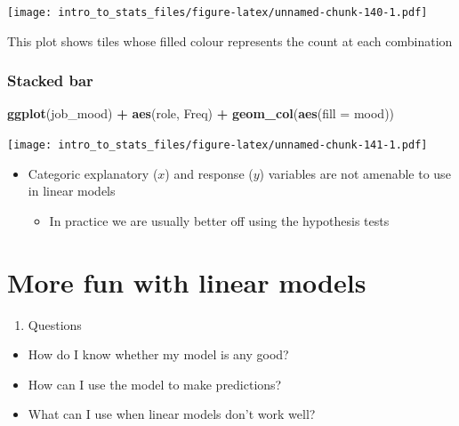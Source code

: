 \documentclass[
]{book}
\newenvironment{Shaded}{\begin{snugshade}}{\end{snugshade}}
\newcommand{\DataTypeTok}[1]{\textcolor[rgb]{0.13,0.29,0.53}{#1}}
\newcommand{\KeywordTok}[1]{\textcolor[rgb]{0.13,0.29,0.53}{\textbf{#1}}}
\newcommand{\NormalTok}[1]{#1}
\newcommand{\OperatorTok}[1]{\textcolor[rgb]{0.81,0.36,0.00}{\textbf{#1}}}
\newcommand{\StringTok}[1]{\textcolor[rgb]{0.31,0.60,0.02}{#1}}
\providecommand{\tightlist}{%
  \setlength{\itemsep}{0pt}\setlength{\parskip}{0pt}}
\newenvironment{roundup}
{ \begin{tcolorbox}[colbacktitle=yellow!50!white,
title=Round Up,coltitle=black,
fonttitle=\bfseries] }
{  \end{tcolorbox} }
\begin{document}
\texttt{[image: intro\_to\_stats\_files/figure-latex/unnamed-chunk-140-1.pdf]}

This plot shows tiles whose filled colour represents the count at each combination

\hypertarget{stacked-bar}{%
\subsection{Stacked bar}\label{stacked-bar}}

\begin{Shaded}
\begin{Highlighting}[]
\KeywordTok{ggplot}\NormalTok{(job_mood) }\OperatorTok{+}\StringTok{ }\KeywordTok{aes}\NormalTok{(role, Freq) }\OperatorTok{+}\StringTok{ }\KeywordTok{geom_col}\NormalTok{(}\KeywordTok{aes}\NormalTok{(}\DataTypeTok{fill =}\NormalTok{ mood))}
\end{Highlighting}
\end{Shaded}

\texttt{[image: intro\_to\_stats\_files/figure-latex/unnamed-chunk-141-1.pdf]}

\begin{roundup}
\begin{itemize}
\tightlist
\item
  Categoric explanatory (\(x\)) and response (\(y\)) variables are not amenable to use in linear models

  \begin{itemize}
  \tightlist
  \item
    In practice we are usually better off using the hypothesis tests
  \end{itemize}
\end{itemize}
\end{roundup}

\hypertarget{more-fun-with-linear-models}{%
\chapter{More fun with linear models}\label{more-fun-with-linear-models}}

\begin{enumerate}
\def\labelenumi{\arabic{enumi}.}
\tightlist
\item
  Questions
\end{enumerate}

\begin{itemize}
\tightlist
\item
  How do I know whether my model is any good?
\item
  How can I use the model to make predictions?
\item
  What can I use when linear models don't work well?
\end{itemize}
\end{document}
